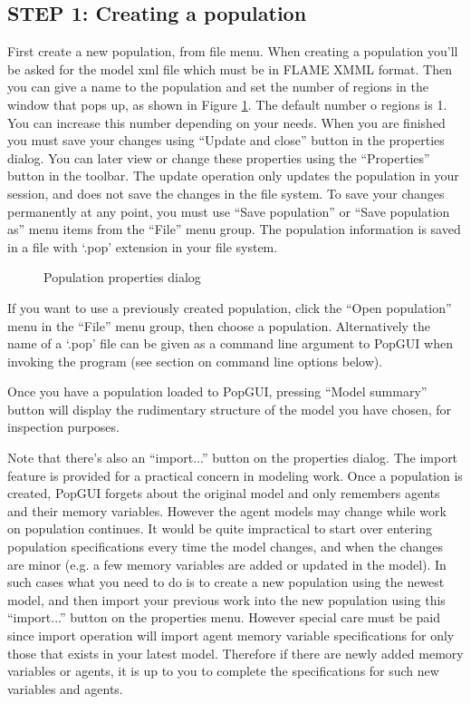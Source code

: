 \documentclass[10pt]{article}
\begin{document}
\subsection{STEP 1: Creating a population}
First create a new population, from file menu. When creating a population you'll be asked for the model xml file which must be in FLAME XMML format. Then you can give a name to the population and set the number of regions in the window that pops up, as shown in Figure \ref{fig:properties}. The default number o regions is 1. You can increase this number depending on your needs. When you are finished you must save your changes using ``Update and close'' button in the properties dialog. You can later view or change these properties using the ``Properties'' button in the toolbar. The update operation only updates the population in your session, and does not save the changes in the file system. To save your changes permanently at any point, you must use ``Save population'' or ``Save population as'' menu items from the ``File'' menu group. The population information is saved in a file with `.pop' extension in your file system.
\begin{figure}
  \begin{center}
  \end{center}
  \caption{Population properties dialog}
  \label{fig:properties}
\end{figure}
If you want to use a previously created population, click the ``Open population'' menu in the ``File'' menu group, then choose a population. Alternatively the name of a `.pop' file can be given as a command line argument to PopGUI when invoking the program (see section on command line options below).

Once you have a population loaded to PopGUI, pressing ``Model summary'' button will display the rudimentary structure of the model you have chosen, for inspection purposes. 

Note that there's also an ``import...'' button on the properties dialog. The import feature is provided for a practical concern in modeling work. Once a population is created, PopGUI forgets about the original model and only remembers agents and their memory variables. However the agent models may change while work on population continues. It would be quite impractical to start over entering population specifications every time the model changes, and when the changes are minor (e.g. a few memory variables are added or updated in the model). In such cases what you need to do is to create a new population using the newest model, and then import your previous work into the new population using this ``import...'' button on the properties menu. However special care must be paid since import operation will import agent memory variable specifications for only those that exists in your latest model. Therefore if there are newly added memory variables or agents, it is up to you to complete the specifications for such new variables and agents.
\end{document}
